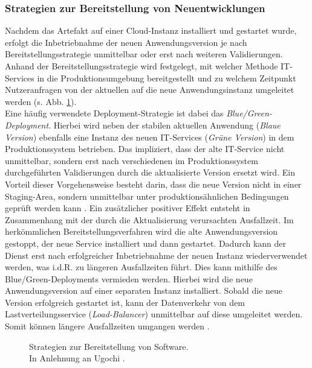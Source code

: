\subsubsection{Strategien zur Bereitstellung von Neuentwicklungen}
\label{sec:Bereitstellungs_Strategien}
Nachdem das Artefakt auf einer Cloud-Instanz installiert und gestartet wurde, erfolgt die Inbetriebnahme der neuen Anwendungsversion je nach Bereitstellungsstrategie unmittelbar oder erst nach weiteren Validierungen. Anhand der Bereitstellungsstrategie wird festgelegt, mit welcher Methode IT-Services in die Produktionsumgebung bereitgestellt und zu welchem Zeitpunkt Nutzeranfragen von der aktuellen auf die neue Anwendungsinstanz umgeleitet werden (s. Abb. \ref{fig:DS}).\\
Eine häufig verwendete Deployment-Strategie ist dabei das \textit{Blue/Green-Deployment}. Hierbei wird neben der stabilen aktuellen Anwendung (\textit{Blaue Version}) ebenfalls eine Instanz des neuen IT-Services (\textit{Grüne Version}) in dem Produktionssystem betrieben. Das impliziert, dass der alte IT-Service nicht unmittelbar, sondern erst nach verschiedenen im Produktionssystem durchgeführten Validierungen durch die aktualisierte Version ersetzt wird. Ein Vorteil dieser Vorgehensweise besteht darin, dass die neue Version nicht in einer Staging-Area, sondern unmittelbar unter produktionsähnlichen Bedingungen geprüft werden kann \cite{Ugochi.20220503}. Ein zusätzlicher positiver Effekt entsteht in Zusammenhang mit der durch die Aktualisierung verursachten Ausfallzeit. Im herkömmlichen Bereitstellungsverfahren wird die alte Anwendungsversion gestoppt, der neue Service installiert und dann gestartet. Dadurch kann der Dienst erst nach erfolgreicher Inbetriebnahme der neuen Instanz wiederverwendet werden, was i.d.R. zu längeren Ausfallzeiten führt. Dies kann mithilfe des Blue/Green-Deployments vermieden werden. Hierbei wird die neue Anwendungsversion  auf einer separaten Instanz installiert. Sobald die neue Version erfolgreich gestartet ist, kann der Datenverkehr von dem Lastverteilungsservice (\textit{Load-Balancer}) unmittelbar auf diese umgeleitet werden. Somit können längere Ausfallzeiten umgangen werden \cite[1083]{Rudrabhatla.10720201092020}. 
\begin{center}
	\begin{figure}[H]
		\centering
		\caption[Strategien zur Bereitstellung von Software]{Strategien zur Bereitstellung von Software.\\ In Anlehnung an Ugochi \cite{Ugochi.20220503}.}
		\label{fig:DS}
	\end{figure}
\end{center}
